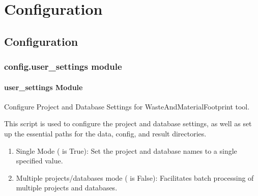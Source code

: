 \documentclass[letterpaper,10pt,english]{sphinxmanual}
\begin{document}
\chapter{Configuration}
\label{\detokenize{modules_api:configuration}}
\sphinxstepscope


\section{Configuration}
\label{\detokenize{configuration_api:configuration}}\label{\detokenize{configuration_api::doc}}

\subsection{config.user\_settings module}
\label{\detokenize{configuration_api:module-config.user_settings}}\label{\detokenize{configuration_api:config-user-settings-module}}

\subsubsection{user\_settings Module}
\label{\detokenize{configuration_api:user-settings-module}}
\sphinxAtStartPar
Configure Project and Database Settings for WasteAndMaterialFootprint tool.

\sphinxAtStartPar
This script is used to configure the project and database settings, as well as set up the essential paths for the data, config, and result directories.
\begin{description}
\begin{enumerate}
%
\item {} 
\sphinxAtStartPar
Single Mode ( is True): Set the project and database names to a single specified value.

\item {} 
\sphinxAtStartPar
Multiple projects/databases mode ( is False): Facilitates batch processing of multiple projects and databases.

\end{enumerate}

\end{description}
\end{document}
